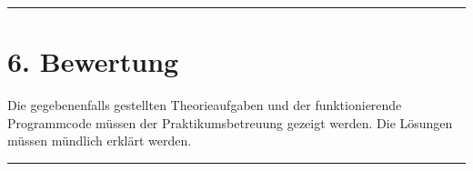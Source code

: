 \documentclass[a4paper,10pt,english]{report}
\begin{document}
\begin{sphinxVerbatim}[commandchars=\\\{\}]
 
  
\end{sphinxVerbatim}


\bigskip\hrule\bigskip



\section{6. Bewertung}
\label{\detokenize{P04_Modularisieren_von_C_Code/new_P04/P04_Modularisieren_von_C_Code:bewertung}}
\sphinxAtStartPar
Die gegebenenfalls gestellten Theorieaufgaben und der funktionierende Programmcode müssen der Praktikumsbetreuung gezeigt werden. Die Lösungen müssen mündlich erklärt werden.


\bigskip\hrule\bigskip
\end{document}
